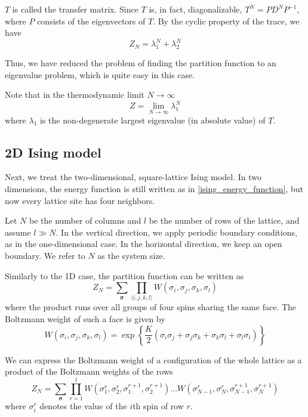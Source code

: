 $T$ is called the transfer matrix. Since $T$ is, in fact, diagonalizable, $T^N = P D^N
P^{-1}$, where $P$ consists of the eigenvectors of $T$. By the cyclic property of the
trace, we have
\begin{equation}
  Z_N = \lambda_{1}^{N} + \lambda_{2}^{N}
\end{equation}

Thus, we have reduced the problem of finding the partition function to an
eigenvalue problem, which is quite easy in this case.

Note that in the thermodynamic limit $N \to \infty$
\begin{equation}
  Z = \lim_{N \to \infty} \lambda_{1}^{N}
\end{equation}
where $\lambda_1$ is the non-degenerate largest eigenvalue (in absolute value) of $T$.

\subsection{2D Ising model}

Next, we treat the two-dimensional, square-lattice Ising model. In two
dimensions, the energy function is still written as in
\eqref{ising_energy_function}, but now every lattice site has four neighbors.

Let $N$ be the number of columns and $l$ be the number of rows of the lattice, and assume
$l \gg N$. In the vertical direction, we apply periodic boundary conditions, as in the
one-dimensional case. In the horizontal direction, we keep an open boundary. We refer to
$N$ as the system size.

Similarly to the 1D case, the partition function can be written as
\begin{equation}
  Z_N = \sum_{\bm{\sigma}} \prod_{\langle i, j, k, l \rangle} W(\sigma_i, \sigma_j, \sigma_k, \sigma_l)
\end{equation}
where the product runs over all groups of four spins sharing the same face. The Boltzmann weight of such a face is given by
\begin{equation}\label{eq:boltzmann_weight_face_ising_model}
  W(\sigma_i, \sigma_j, \sigma_k, \sigma_l) = \exp \left\{ \frac{K}{2} (\sigma_i \sigma_j + \sigma_j \sigma_k + \sigma_k \sigma_l + \sigma_l \sigma_i) \right\}
\end{equation}

We can express the Boltzmann weight of a configuration of the whole lattice as
a product of the Boltzmann weights of the rows
\begin{equation}
  Z_N = \sum_{\bm{\sigma}} \prod_{r = 1}^{l} W(\sigma_{1}^{r}, \sigma_{2}^{r}, \sigma_{1}^{r+1}, \sigma_{2}^{r+1}) \dots W(\sigma_{N-1}^{r}, \sigma_{N}^{r}, \sigma_{N-1}^{r+1}, \sigma_{N}^{r+1})
\end{equation}
where $\sigma_{i}^{r}$ denotes the value of the $i$th spin of row $r$.

